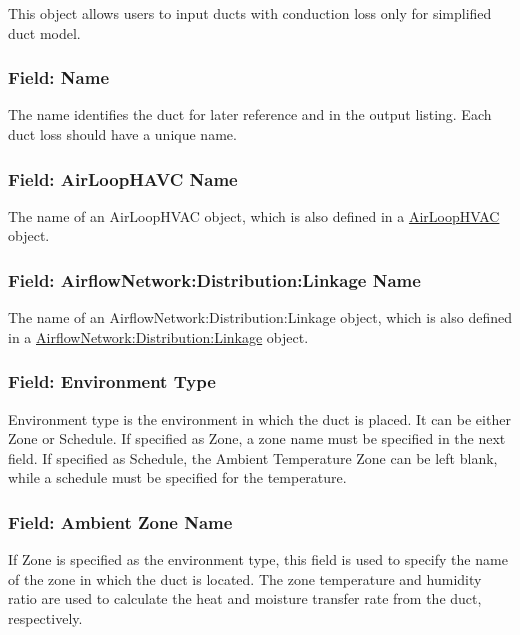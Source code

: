 This object allows users to input ducts with conduction loss only for simplified duct model.

\subsubsection{Field: Name}\label{field-name-duct-conduction}

The name identifies the duct for later reference and in the output listing. Each duct loss should have a unique name.

\subsubsection{Field: AirLoopHAVC Name}\label{duct-conduction-airloophavcname}

The name of an AirLoopHVAC object, which is also defined in a \hyperref[airloophvac]{AirLoopHVAC} object.

\subsubsection{Field: AirflowNetwork:Distribution:Linkage Name}\label{duct-conduction-airflownetworkdistributionlinkagename}

The name of an AirflowNetwork:Distribution:Linkage object, which is also defined in a \hyperref[airflownetworkdistributionlinkage]{AirflowNetwork:Distribution:Linkage} object.

\subsubsection{Field: Environment Type}\label{environmenttype}

Environment type is the environment in which the duct is placed. It can be either Zone or Schedule. If specified as Zone, a zone name must be specified in the next field. If specified as Schedule, the Ambient Temperature Zone can be left blank, while a schedule must be specified for the temperature.

\subsubsection{Field: Ambient Zone Name}\label{ambienttemperaturezonename}

If Zone is specified as the environment type, this field is used to specify the name of the zone in which the duct is located. The zone temperature and humidity ratio are used to calculate the heat and moisture transfer rate from the duct, respectively.

